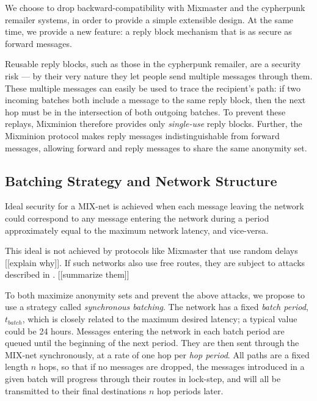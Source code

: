 \documentclass{llncs}
\begin{document}
We choose to drop backward-compatibility with Mixmaster and the cypherpunk
remailer systems, in order to provide a simple extensible design. At
the same time, we provide a new feature: a reply block mechanism that
is as secure as forward messages.

Reusable reply blocks, such as those in the cypherpunk remailer, are a
security risk --- by their very nature they let people send multiple
messages through them.  These multiple messages can easily be used to
trace the recipient's path: if two incoming batches both include a
message to the same reply block, then the next hop must be in the
intersection of both outgoing batches.  To prevent these replays,
Mixminion therefore provides only \emph{single-use} reply
blocks. Further, the Mixminion protocol makes reply messages
indistinguishable from forward messages, allowing forward and reply
messages to share the same anonymity set.

\subsection{Batching Strategy and Network Structure}
\label{subsec:batching}


Ideal security for a MIX-net is achieved when each message leaving the
network could correspond to any message entering the network during a
period approximately equal to the maximum network latency, and vice-versa.

This ideal is not achieved by protocols like Mixmaster that use random
delays [[explain why]].
If such networks also use free routes, they are subject to attacks
described in \cite{disad-free-routes}. [[summarize them]]

To both maximize anonymity sets and prevent the above attacks, we
propose to use a strategy called {\em synchronous batching}.
The network has a fixed {\em batch period}, $t_{batch}$, which is closely
related to the maximum desired latency; a typical value could be 24 hours.
Messages entering the network in each batch period are queued until
the beginning of the next period. They are then sent through the MIX-net
synchronously, at a rate of one hop per {\em hop period}. All paths are
a fixed length $n$ hops, so that if no messages are dropped, the messages
introduced in a given batch will progress through their routes in
lock-step, and will all be transmitted to their final destinations $n$
hop periods later.
\end{document}
